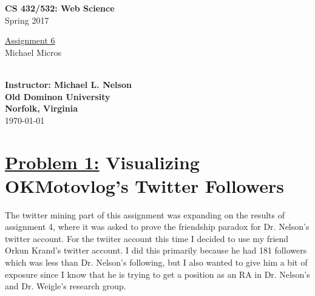 \documentclass{article}
\begin{document}

\begin{titlepage}

\vspace*{45 pt}
\begin{center}
\Huge{\bf CS 432/532:  Web Science}\\
\huge{Spring 2017\\}

\vspace{60 pt}
\Huge\underline {Assignment 6}\\

\vspace{10 pt}
\Huge{Michael Micros}\\\

{\Large \bf {Instructor: Michael L. Nelson}}\\

\vspace{230 pt}
{\huge \bf {Old Dominon University}}\\
{\huge \bf {Norfolk, Virginia}}\\

\vspace{10 pt}
\today

\end{center}
\end{titlepage}





\section*{{\underline{\huge {Problem 1:}} Visualizing OKMotovlog's Twitter Followers}}

The twitter mining part of this assignment was expanding on the results of assignment 4, where it was asked to prove the friendship paradox for Dr. Nelson's twitter account. 
For the twiiter account this time I decided to use my friend Orkun Krand's twitter account. I did this primarily because he had 181 followers which was less than Dr. Nelson's following, but I also wanted to give him a bit of exposure since I know that he is trying to get a position as an RA in Dr. Nelson's and Dr. Weigle's research group.
\end{document}
